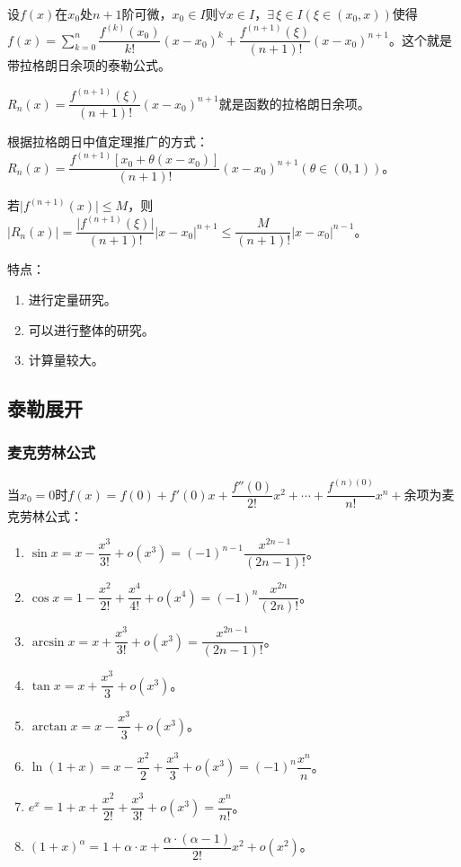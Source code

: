 \documentclass[UTF8, 12pt]{ctexart}
\begin{document}
设$f(x)$在$x_0$处$n+1$阶可微，$x_0\in I$则$\forall x\in I$，$\exists\,\xi\in I(\xi\in(x_0,x))$使得$f(x)=\sum\limits_{k=0}^n\dfrac{f^{(k)}(x_0)}{k!}(x-x_0)^k+\dfrac{f^{(n+1)}(\xi)}{(n+1)!}(x-x_0)^{n+1}$。这个就是带拉格朗日余项的泰勒公式。

$R_n(x)=\dfrac{f^{(n+1)}(\xi)}{(n+1)!}(x-x_0)^{n+1}$就是函数的拉格朗日余项。

根据拉格朗日中值定理推广的方式：$R_n(x)=\dfrac{f^{(n+1)}[x_0+\theta(x-x_0)]}{(n+1)!}(x-x_0)^{n+1}(\theta\in(0,1))$。

若$\vert f^{(n+1)}(x)\vert\leqslant M$，则$\vert R_n(x)\vert=\dfrac{\vert f^{(n+1)}(\xi)\vert}{(n+1)!}\vert x-x_0\vert^{n+1}\leqslant\dfrac{M}{(n+1)!}\vert x-x_0\vert^{n-1}$。

特点：

\begin{enumerate}
    \item 进行定量研究。
    \item 可以进行整体的研究。
    \item 计算量较大。
\end{enumerate}

\subsection{泰勒展开}

\subsubsection{麦克劳林公式}

当$x_0=0$时$f(x)=f(0)+f'(0)x+\dfrac{f''(0)}{2!}x^2+\cdots+\dfrac{f^{(n)(0)}}{n!}x^n+\text{余项}$为麦克劳林公式：

\begin{enumerate}
    \item $\sin x=x-\dfrac{x^3}{3!}+o(x^3)=(-1)^{n-1}\dfrac{x^{2n-1}}{(2n-1)!}$。
    \item $\cos x=1-\dfrac{x^2}{2!}+\dfrac{x^4}{4!}+o(x^4)=(-1)^n\dfrac{x^{2n}}{(2n)!}$。
    \item $\arcsin x=x+\dfrac{x^3}{3!}+o(x^3)=\dfrac{x^{2n-1}}{(2n-1)!}$。
    \item $\tan x=x+\dfrac{x^3}{3}+o(x^3)$。
    \item $\arctan x=x-\dfrac{x^3}{3}+o(x^3)$。
    \item $\ln(1+x)=x-\dfrac{x^2}{2}+\dfrac{x^3}{3}+o(x^3)=(-1)^n\dfrac{x^n}{n}$。
    \item $e^x=1+x+\dfrac{x^2}{2!}+\dfrac{x^3}{3!}+o(x^3)=\dfrac{x^n}{n!}$。
    \item $(1+x)^\alpha=1+\alpha\cdot x+\dfrac{\alpha\cdot(\alpha-1)}{2!}x^2+o(x^2)$。
\end{enumerate}
\end{document}
